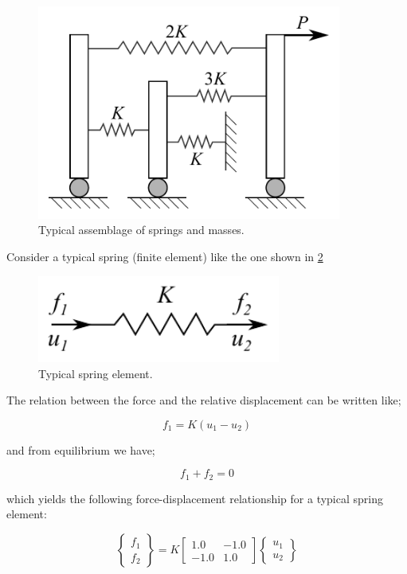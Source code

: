 \begin{figure}[H]
\centering
\includegraphics[width=10cm]{spring_system.pdf}
\caption{Typical assemblage of springs and masses.}
\label{fig:bathe}
\end{figure}


Consider a typical spring (finite element) like the one shown in \cref{fig:springel}

\begin{figure}[H]
\centering
\includegraphics[width=8cm]{springel.pdf}
\caption{Typical spring element.}
\label{fig:springel}
\end{figure}

The relation between the force and the relative displacement can be written like;

\[{f_1} = K({u_1} - {u_2})\]

and from equilibrium we have;

\[{f_1} + {f_2} = 0\]

which yields the following force-displacement relationship for a typical spring element:

\begin{equation}
\left\{ {\begin{array}{*{20}{c}}
{{f_1}}\\
{{f_2}}
\end{array}} \right\} = K\left[ {\begin{array}{*{20}{c}}
{1.0}&{ - 1.0}\\
{ - 1.0}&{1.0}
\end{array}} \right]\left\{ {\begin{array}{*{20}{c}}
{{u_1}}\\
{{u_2}}
\end{array}} \right\}
\label{Kspring}
\end{equation}

